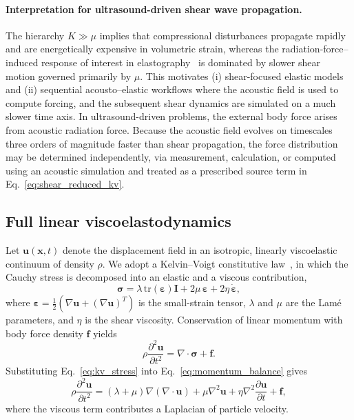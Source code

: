 \documentclass{iopjournal}
\begin{document}
\paragraph{Interpretation for ultrasound-driven shear wave propagation.}
The hierarchy $K \gg \mu$ implies that compressional disturbances
propagate rapidly and are energetically expensive in volumetric
strain, whereas the radiation-force--induced response of interest in
elastography~\cite{sandrin2003transient,tanter2008quantitative} is
dominated by slower shear motion governed primarily by $\mu$. This
motivates (i) shear-focused elastic models and (ii) sequential
acousto--elastic workflows where the acoustic field is used to compute
forcing, and the subsequent shear dynamics are simulated on a much
slower time axis. In ultrasound-driven problems, the external body
force arises from acoustic radiation force. Because the acoustic field
evolves on timescales three orders of magnitude faster than shear
propagation, the force distribution may be determined independently, via measurement, calculation, or computed 
using an acoustic simulation and treated as a prescribed source term
in Eq.~\eqref{eq:shear_reduced_kv}.

\subsection{Full linear viscoelastodynamics}

Let $\mathbf{u}(\mathbf{x},t)$ denote the displacement field in an isotropic,
linearly viscoelastic continuum of density $\rho$. We adopt a Kelvin--Voigt
constitutive
law~\cite{catheline2004viscoelastic,ferry1980viscoelasticity}, in which the
Cauchy stress is decomposed into an elastic and a viscous contribution,
\begin{equation}
\boldsymbol{\sigma}
=
\lambda\,\mathrm{tr}(\boldsymbol{\varepsilon})\mathbf{I}
+ 2\mu\,\boldsymbol{\varepsilon}
+ 2\eta\,\dot{\boldsymbol{\varepsilon}},
\label{eq:kv_stress}
\end{equation}
where $\boldsymbol{\varepsilon} = \tfrac{1}{2}\left(\nabla \mathbf{u} + (\nabla \mathbf{u})^T\right)$
is the small-strain tensor, $\lambda$ and $\mu$ are the Lam\'e parameters, and
$\eta$ is the shear viscosity. Conservation of linear momentum with body force
density $\mathbf{f}$ yields
\begin{equation}
\rho \frac{\partial^2 \mathbf{u}}{\partial t^2}
=
\nabla\cdot \boldsymbol{\sigma} + \mathbf{f}.
\label{eq:momentum_balance}
\end{equation}
Substituting Eq.~\eqref{eq:kv_stress} into Eq.~\eqref{eq:momentum_balance}
gives
\begin{equation}
\rho \frac{\partial^2 \mathbf{u}}{\partial t^2}
=
(\lambda+\mu)\nabla(\nabla\cdot\mathbf{u})
+ \mu \nabla^2\mathbf{u}
+ \eta \nabla^2 \frac{\partial \mathbf{u}}{\partial t}
+ \mathbf{f},
\label{eq:navier_kv}
\end{equation}
where the viscous term contributes a Laplacian of particle velocity.
\end{document}
